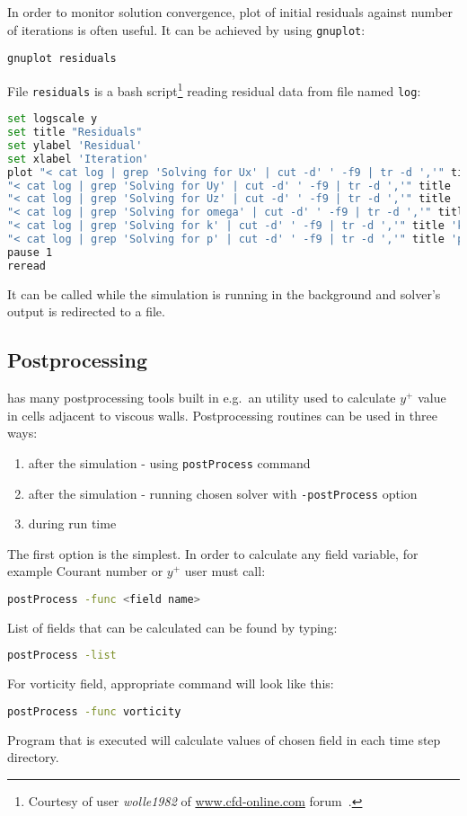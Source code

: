             In order to monitor solution convergence, plot of initial residuals against number of iterations is often useful. It can be achieved by using \texttt{gnuplot}:
            \begin{lstlisting}
gnuplot residuals
            \end{lstlisting}
            File \texttt{residuals} is a bash script\footnote{Courtesy of user \textit{wolle1982} of \url{www.cfd-online.com} forum~\cite{residuals}.} reading residual data from file named \texttt{log}:
            \begin{lstlisting}[showstringspaces=false,language=bash, basicstyle=\footnotesize\ttfamily]
set logscale y
set title "Residuals"
set ylabel 'Residual'
set xlabel 'Iteration'
plot "< cat log | grep 'Solving for Ux' | cut -d' ' -f9 | tr -d ','" title 'Ux' with lines,\
"< cat log | grep 'Solving for Uy' | cut -d' ' -f9 | tr -d ','" title 'Uy' with lines,\
"< cat log | grep 'Solving for Uz' | cut -d' ' -f9 | tr -d ','" title 'Uz' with lines,\
"< cat log | grep 'Solving for omega' | cut -d' ' -f9 | tr -d ','" title 'omega' with lines,\
"< cat log | grep 'Solving for k' | cut -d' ' -f9 | tr -d ','" title 'k' with lines,\
"< cat log | grep 'Solving for p' | cut -d' ' -f9 | tr -d ','" title 'p' with lines
pause 1
reread
            \end{lstlisting}
            It can be called while the simulation is running in the background and solver's output is redirected to a file.
        \subsection{Postprocessing}
            \oFoam has many postprocessing tools built in e.g.\ an utility used to calculate $y^+$ value in cells adjacent to viscous walls.
            Postprocessing routines can be used in three ways:
            \begin{enumerate}
                \item after the simulation - using \texttt{postProcess} command
                \item after the simulation - running chosen solver with \texttt{-postProcess} option
                \item during run time
            \end{enumerate}
            The first option is the simplest. In order to calculate any field variable, for example Courant number or $y^+$ user must call:
            \begin{lstlisting}[language=bash]
postProcess -func <field name> 
            \end{lstlisting}
            List of fields that can be calculated can be found by typing:
            \begin{lstlisting}[language=bash]
postProcess -list
            \end{lstlisting}
            For vorticity field, appropriate command will look like this:
            \begin{lstlisting}[language=bash]
postProcess -func vorticity
            \end{lstlisting}
            Program that is executed will calculate values of chosen field in each time step directory.

